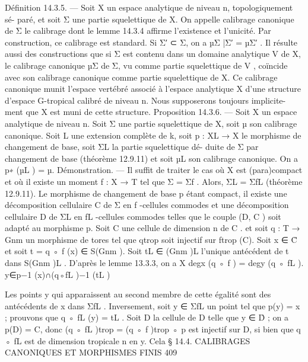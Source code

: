\documentclass[
  10pt,
]{article}
\newenvironment{Shaded}{}{}
\newcommand{\NormalTok}[1]{#1}
\begin{document}
\begin{Shaded}
\begin{Highlighting}[]
\NormalTok{Définition 14.3.5. — Soit X un espace analytique de niveau n, topologiquement sé{-}}
\NormalTok{paré, et soit Σ une partie squelettique de X. On appelle calibrage canonique de Σ le}
\NormalTok{calibrage dont le lemme 14.3.4 affirme l’existence et l’unicité.}
\NormalTok{   Par construction, ce calibrage est standard. Si Σ′ ⊂ Σ, on a µΣ |Σ′ = µΣ′ . Il résulte}
\NormalTok{aussi des constructions que si Σ est contenu dans un domaine analytique V de X, le}
\NormalTok{calibrage canonique µΣ de Σ, vu comme partie squelettique de V , coïncide avec son}
\NormalTok{calibrage canonique comme partie squelettique de X.}
\NormalTok{   Ce calibrage canonique munit l’espace vertébré associé à l’espace analytique X d’une}
\NormalTok{structure d’espace G{-}tropical calibré de niveau n. Nous supposerons toujours implicite{-}}
\NormalTok{ment que X est muni de cette structure.}
\NormalTok{Proposition 14.3.6. — Soit X un espace analytique de niveau n. Soit Σ une partie}
\NormalTok{squelettique de X, soit µ son calibrage canonique. Soit L une extension complète de k,}
\NormalTok{soit p : XL → X le morphisme de changement de base, soit ΣL la partie squelettique dé{-}}
\NormalTok{duite de Σ par changement de base (théorème 12.9.11) et soit µL son calibrage canonique.}
\NormalTok{On a p∗ (µL ) = µ.}
\NormalTok{Démonstration. — Il suffit de traiter le cas où X est (para)compact et où il existe un}
\NormalTok{moment f : X → T tel que Σ = Σf . Alors, ΣL = ΣfL (théorème 12.9.11). Le morphisme}
\NormalTok{de changement de base p étant compact, il existe une décomposition cellulaire C de Σ en}
\NormalTok{f {-}cellules commodes et une décomposition cellulaire D de ΣL en fL {-}cellules commodes}
\NormalTok{telles que le couple (D, C ) soit adapté au morphisme p. Soit C une cellule de dimension n}
\NormalTok{de C . et soit q : T → Gnm un morphisme de tores tel que qtrop soit injectif sur ftrop (C).}
\NormalTok{Soit x ∈ C̊ et soit t = q ◦ f (x) ∈ S(Gnm ). Soit tL ∈ (Gnm )L l’unique antécédent de t}
\NormalTok{dans S(Gnm )L . D’après le lemme 13.3.3, on a}
\NormalTok{                                             X}
\NormalTok{                       degx (q ◦ f ) =                 degy (q ◦ fL ).}
\NormalTok{                                      y∈p−1 (x)∩(q◦fL )−1 (tL )}

\NormalTok{Les points y qui apparaissent au second membre de cette égalité sont des antécédents}
\NormalTok{de x dans ΣfL . Inversement, soit y ∈ ΣfL un point tel que p(y) = x ; prouvons que}
\NormalTok{q ◦ fL (y) = tL . Soit D la cellule de D telle que y ∈ D̊ ; on a p(D) = C, donc (q ◦ fL )trop =}
\NormalTok{(q ◦ f )trop ◦ p est injectif sur D, si bien que q ◦ fL est de dimension tropicale n en y. Cela}
\NormalTok{                  § 14.4. CALIBRAGES CANONIQUES ET MORPHISMES FINIS                         409}


\end{Highlighting}
\end{Shaded}
\end{document}
